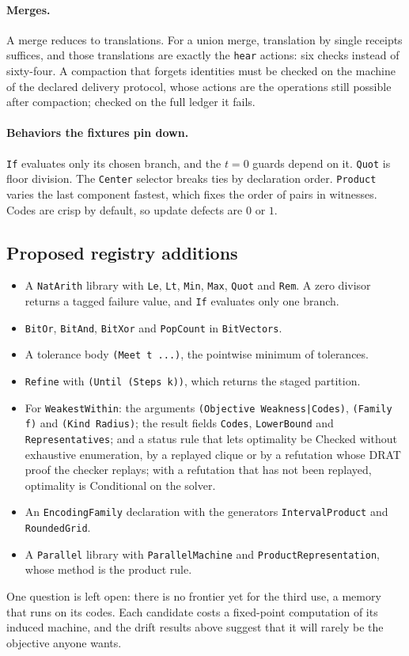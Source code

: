\documentclass[11pt]{article}
\newcommand{\code}[1]{\texttt{#1}}
\theoremstyle{definition}
\theoremstyle{plain}
\begin{document}
\paragraph{Merges.} A merge reduces to translations. For a union merge, translation by single
receipts suffices, and those translations are exactly the \code{hear} actions: six checks instead
of sixty-four. A compaction that forgets identities must be checked on the machine of the declared
delivery protocol, whose actions are the operations still possible after compaction; checked on the
full ledger it fails.

\paragraph{Behaviors the fixtures pin down.} \code{If} evaluates only its chosen branch, and the
$t=0$ guards depend on it. \code{Quot} is floor division. The \code{Center} selector breaks ties by
declaration order. \code{Product} varies the last component fastest, which fixes the order of pairs
in witnesses. Codes are crisp by default, so update defects are $0$ or $1$.

\subsection{Proposed registry additions}

\begin{itemize}
\item A \code{NatArith} library with \code{Le}, \code{Lt}, \code{Min}, \code{Max}, \code{Quot} and
\code{Rem}. A zero divisor returns a tagged failure value, and \code{If} evaluates only one branch.
\item \code{BitOr}, \code{BitAnd}, \code{BitXor} and \code{PopCount} in \code{BitVectors}.
\item A tolerance body \code{(Meet t ...)}, the pointwise minimum of tolerances.
\item \code{Refine} with \code{(Until (Steps k))}, which returns the staged partition.
\item For \code{WeakestWithin}: the arguments \code{(Objective Weakness|Codes)}, \code{(Family f)} and
\code{(Kind Radius)}; the result fields \code{Codes}, \code{LowerBound} and \code{Representatives};
and a status rule that lets optimality be Checked without exhaustive enumeration, by a replayed
clique or by a refutation whose DRAT proof the checker replays; with a refutation that has not been
replayed, optimality is Conditional on the solver.
\item An \code{EncodingFamily} declaration with the generators \code{IntervalProduct} and
\code{RoundedGrid}.
\item A \code{Parallel} library with \code{ParallelMachine} and \code{ProductRepresentation}, whose
method is the product rule.
\end{itemize}
One question is left open: there is no frontier yet for the third use, a memory that runs on its
codes. Each candidate costs a fixed-point computation of its induced machine, and the drift results
above suggest that it will rarely be the objective anyone wants.
\end{document}
